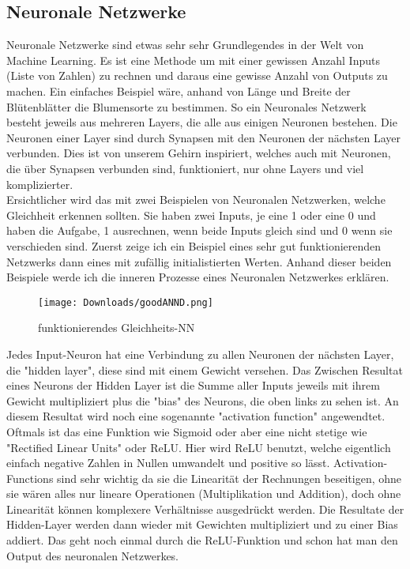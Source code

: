 \documentclass[10pt,a4paper,ngerman,english]{article}
\begin{document}
\subsection{Neuronale Netzwerke}

Neuronale Netzwerke sind etwas sehr sehr Grundlegendes in der Welt von Machine Learning. Es ist eine Methode um mit einer gewissen Anzahl Inputs (Liste von Zahlen) zu rechnen und daraus eine gewisse Anzahl von Outputs zu machen. Ein einfaches Beispiel wäre, anhand von Länge und Breite der Blütenblätter die Blumensorte zu bestimmen. So ein Neuronales Netzwerk besteht jeweils aus mehreren Layers, die alle aus einigen Neuronen bestehen. Die Neuronen einer Layer sind durch Synapsen mit den Neuronen der nächsten Layer verbunden. Dies ist von unserem Gehirn inspiriert, welches auch mit Neuronen, die über Synapsen verbunden sind, funktioniert, nur ohne Layers und viel komplizierter.\\

Ersichtlicher wird das mit zwei Beispielen von Neuronalen Netzwerken, welche Gleichheit erkennen sollten. Sie haben zwei Inputs, je eine 1 oder eine 0 und haben die Aufgabe, 1 ausrechnen, wenn beide Inputs gleich sind und 0 wenn sie verschieden sind. Zuerst zeige ich ein Beispiel eines sehr gut funktionierenden Netzwerks dann eines mit zufällig initialistierten Werten. Anhand dieser beiden Beispiele werde ich die inneren Prozesse eines Neuronalen Netzwerkes erklären. 

\begin{figure}[h]
    \begin{center}
        \texttt{[image: Downloads/goodANND.png]}
        \caption{funktionierendes Gleichheits-NN}
    \end{center}
\end{figure}

Jedes Input-Neuron hat eine Verbindung zu allen Neuronen der nächsten Layer, die "hidden layer", diese sind mit einem Gewicht versehen. Das Zwischen Resultat eines Neurons der Hidden Layer ist die Summe aller Inputs jeweils mit ihrem Gewicht multipliziert plus die "bias" des Neurons, die oben links zu sehen ist. An diesem Resultat wird noch eine sogenannte "activation function" angewendtet. Oftmals ist das eine Funktion wie Sigmoid oder aber eine nicht stetige wie "Rectified Linear Units" oder ReLU. Hier wird ReLU benutzt, welche eigentlich einfach negative Zahlen in Nullen umwandelt und positive so lässt. Activation-Functions sind sehr wichtig da sie die Linearität der Rechnungen beseitigen, ohne sie wären alles nur lineare Operationen (Multiplikation und Addition), doch ohne Linearität können komplexere Verhältnisse ausgedrückt werden. Die Resultate der Hidden-Layer werden dann wieder mit Gewichten multipliziert und zu einer Bias addiert. Das geht noch einmal durch die ReLU-Funktion und schon hat man den Output des neuronalen Netzwerkes.
\end{document}
